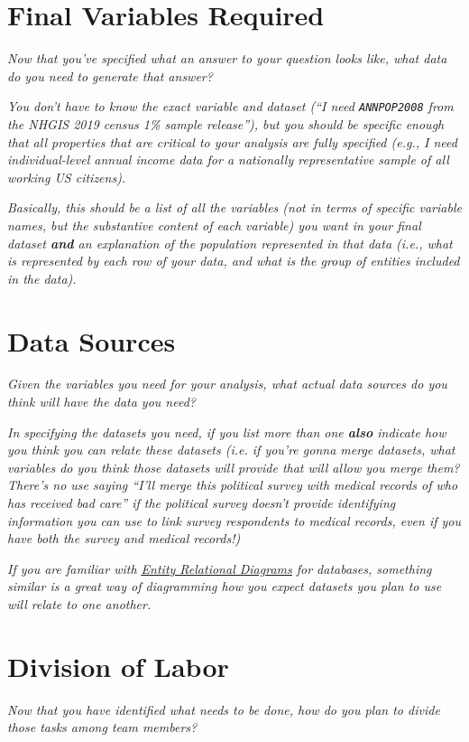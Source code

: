 \documentclass[12pt]{article}
\begin{document}
\section{Final Variables Required}

\emph{Now that you've specified what an answer to your question looks like, what data do you need to generate that answer?}

\emph{You don't have to know the exact variable and dataset (``I need \texttt{ANNPOP2008} from the NHGIS 2019 census 1\% sample release''), but you should be specific enough that all properties that are critical to your analysis are fully specified (e.g., I need individual-level annual income data for a nationally representative sample of all working US citizens).}

\emph{Basically, this should be a list of all the variables (not in terms of specific variable names, but the substantive content of each variable) you want in your final dataset \textbf{and} an explanation of the population represented in that data (i.e., what is represented by each row of your data, and what is the group of entities included in the data).}


\pagebreak
\section{Data Sources}

\emph{Given the variables you need for your analysis, what actual data sources do you think will have the data you need?}

\emph{In specifying the datasets you need, if you list more than one \textbf{also} indicate how you think you can relate these datasets (i.e. if you're gonna merge datasets, what variables do you think those datasets will provide that will allow you merge them? There's no use saying ``I'll merge this political survey with medical records of who has received bad care'' if the political survey doesn't provide identifying information you can use to link survey respondents to medical records, even if you have both the survey and medical records!)}

\emph{If you are familiar with \href{https://www.visual-paradigm.com/guide/data-modeling/what-is-entity-relationship-diagram/}{\underline{Entity Relational Diagrams}} for databases, something similar is a great way of diagramming how you expect datasets you plan to use will relate to one another.}
\vspace*{8cm}\\

\section{Division of Labor}

\emph{Now that you have identified what needs to be done, how do you plan to divide those tasks among team members?}
\end{document}
